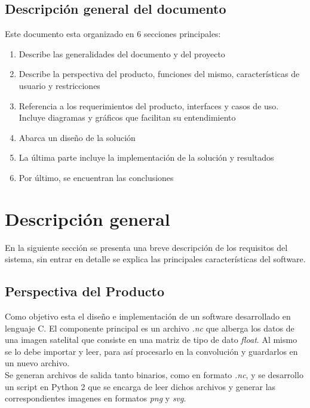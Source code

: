 \documentclass{article}
\begin{document}
\subsection{Descripción general del documento}
Este documento esta organizado en 6 secciones principales:
\begin{enumerate}
\item Describe las generalidades del documento y del proyecto
\item Describe la perspectiva del producto, funciones del mismo, características de usuario y restricciones
\item Referencia a los requerimientos del producto, interfaces y casos de uso. Incluye diagramas y gráficos que facilitan su entendimiento
\item Abarca un diseño de la solución
\item La última parte incluye la implementación de la solución y resultados
\item Por último, se encuentran las conclusiones
\end{enumerate}
\section{Descripción general}
En la siguiente sección se presenta una breve descripción de los requisitos del sistema, sin entrar en detalle se explica las principales características del software.\\
\subsection{Perspectiva del Producto}
Como objetivo esta el diseño e implementación de un software desarrollado en lenguaje C. El componente principal es un archivo \textit{.nc} que alberga los datos de una imagen satelital que consiste en una matriz de tipo de dato \textit{float}. Al mismo se lo debe importar y leer, para así procesarlo en la convolución y guardarlos en un nuevo archivo. \\

Se generan archivos de salida tanto binarios, como en formato \textit{.nc}, y se desarrollo un script en Python 2 que se encarga de leer dichos archivos y generar las correspondientes imagenes en formatos \textit{png} y \textit{svg}.\\
\end{document}
